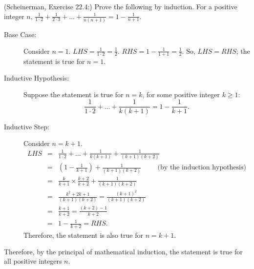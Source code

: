 \documentclass{article}
\theoremstyle{definition}
\begin{document}
\begin{question}
    (Scheinerman, Exercise 22.4:) 
    Prove the following by induction.  For a positive integer $n$, $\displaystyle \frac{1}{1\cdot 2} + \frac{1}{2 \cdot 3} + \ldots + \frac{1}{n(n+1)} = 1 - \frac{1}{n+1}$.
\end{question}
\begin{solution}
   \begin{description}
    \item[Base Case: ] Consider $n = 1$.  $LHS = \frac{1}{1 \cdot 2} = \frac{1}{2}$.  $RHS = 1 - \frac{1}{1+1} = \frac{1}{2}$. So, $LHS = RHS$; the statement is true for $n =1$.
    \item[Inductive Hypothesis: ] Suppose the statement is true for $n = k$, for some positive integer $k \geq 1$:
    \[ \frac{1}{1\cdot 2} + \ldots + \frac{1}{k(k+1)} = 1 - \frac{1}{k+1}. \]
    \item[Inductive Step: ] Consider $n = k+1$.
    \begin{eqnarray*}
    LHS & = & \frac{1}{1\cdot 2} + \ldots + \frac{1}{k(k+1)} + \frac{1}{(k+1)(k+2)} \\
   & = & \left(1 - \frac{1}{k+1}\right) + \frac{1}{(k+1)(k+2)} \hspace{1cm}\text{(by the induction hypothesis)} \\
   & = & \frac{k}{k+1} \times \frac{k+2}{k+2} + \frac{1}{(k+1)(k+2)} \\
   & = & \frac{k^2 + 2k + 1}{(k+1)(k+2)} = \frac{(k+1)^2}{(k+1)(k+2)} \\
   & = & \frac{k+1}{k+2} = \frac{(k+2) - 1}{k+2} \\
   & = & 1 - \frac{1}{k+2} = RHS.
  \end{eqnarray*}
  Therefore, the statement is also true for $n = k+1$.
  \end{description}
  Therefore, by the principal of mathematical induction, the statement is true for all positive integers $n$.
\end{solution}
\end{document}
